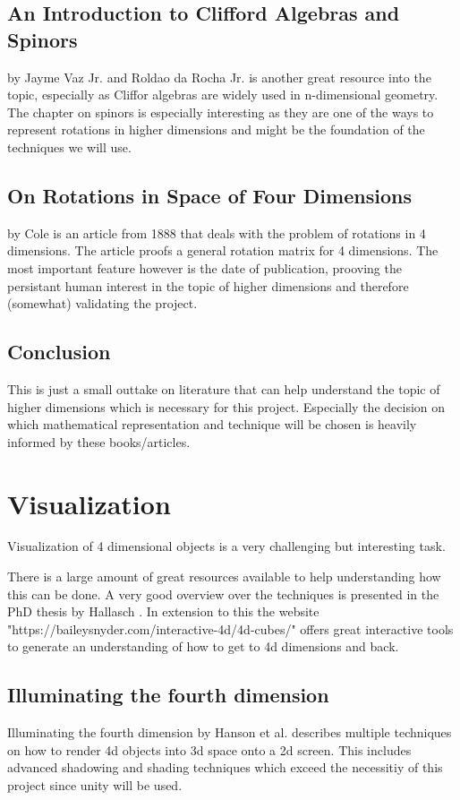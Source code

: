 \documentclass{article}
\begin{document}
\subsection{An Introduction to Clifford Algebras and Spinors} by Jayme Vaz Jr. and Roldao da Rocha Jr. \cite{cliff_alg} is another great resource into the topic, especially as Cliffor algebras are widely used in n-dimensional geometry. The chapter on spinors is especially interesting as they are one of the ways to represent rotations in higher dimensions and might be the foundation of the techniques we will use.
\subsection{On Rotations in Space of Four Dimensions} by Cole \cite{rot_n_1} is an article from 1888 that deals with the problem of rotations in 4 dimensions. The article proofs a general rotation matrix for 4 dimensions. The most important feature however is the date of publication, prooving the persistant human interest in the topic of higher dimensions and therefore (somewhat) validating the project.
\subsection{Conclusion}
This is just a small outtake on literature that can help understand the topic of higher dimensions which is necessary for this project. Especially the decision on which mathematical representation and technique will be chosen is heavily informed by these books/articles.
\section{Visualization}

Visualization of 4 dimensional objects is a very challenging but interesting task.

There is a large amount of great resources available to help understanding how this can be done. A very good overview over the techniques is presented in the PhD thesis by Hallasch \cite{4d_vis_1}. In extension to this the website "https://baileysnyder.com/interactive-4d/4d-cubes/" \cite{4d_vis_2} offers great interactive tools to generate an understanding of how to get to 4d dimensions and back.
\subsection{Illuminating the fourth dimension} Illuminating the fourth dimension by Hanson et al. \cite{4d_vis_3} describes multiple techniques on how to render 4d objects into 3d space onto a 2d screen. This includes advanced shadowing and shading techniques which exceed the necessitiy of this project since unity will be used.
\newpage
\end{document}
